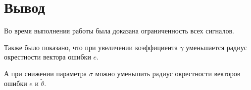 \documentclass[14pt, a4paper]{extarticle}
\begin{document}
	\newpage
	
	\section*{Вывод}
	
	Во время выполнения работы была доказана ограниченность всех сигналов.
	
	Также было показано, что при увеличении коэффициента $\gamma$ уменьшается радиус окрестности вектора ошибки $e$.
	
	А при снижении параметра $\sigma$ можно уменьшить радиус окрестности векторов ошибки $e$ и $\tilde{\theta}$.
	
	
\end{document}
